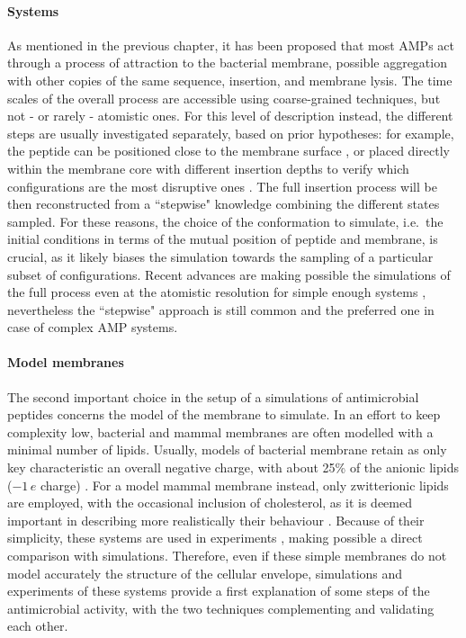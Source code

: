 \paragraph{Systems} As mentioned in the previous chapter, it has been proposed that most AMPs act through a process of attraction to the bacterial membrane, possible aggregation with other copies of the same sequence, insertion, and membrane lysis. The time scales of the overall process are accessible using coarse-grained techniques, but not - or rarely - atomistic ones.
%
For this level of description instead, the different steps are usually investigated separately, based on prior hypotheses: for example, the peptide can be positioned close to the membrane surface \citep{Wang2012}, or placed directly within the membrane core with different insertion depths to verify which configurations are the most disruptive ones \citep{Lipkin2017}. The full insertion process will be then reconstructed from a ``stepwise" knowledge combining the different states sampled.
%
For these reasons, the choice of the conformation to simulate, i.e.\ the initial conditions in terms of the mutual position of peptide and membrane, is crucial, as it likely biases the simulation towards the sampling of a particular subset of configurations. Recent advances are making possible the simulations of the full process even at the atomistic resolution for simple enough systems \citep{Ulmschneider2017,Sun2015}, nevertheless the ``stepwise" approach is still common and the preferred one in case of complex AMP systems.

\paragraph{Model membranes} The second important choice in the setup of a simulations of antimicrobial peptides concerns the model of the membrane to simulate. In an effort to keep complexity low, bacterial and mammal membranes are often modelled with a minimal number of lipids.
%
Usually, models of bacterial membrane retain as only key characteristic an overall negative charge, with about 25\% of the anionic lipids ($-1\,e$ charge) \citep{Lipkin2017,Wang2012,Zhao2018,Chen2019}.
For a model mammal membrane instead, only zwitterionic lipids are employed, with the occasional inclusion of cholesterol, as it is deemed important in describing more realistically their behaviour \citep{Lipkin2017,Wang2012,Zhao2018,Chen2019,Risselada2008}.
Because of their simplicity, these systems are used in experiments \citep{Castelletto2016,Tang2009,Glukhov2005}, making possible a direct comparison with simulations.
Therefore, even if these simple membranes do not model accurately the structure of the cellular envelope, simulations and experiments of these systems provide a first explanation of some steps of the antimicrobial activity, with the two techniques complementing and validating each other.

